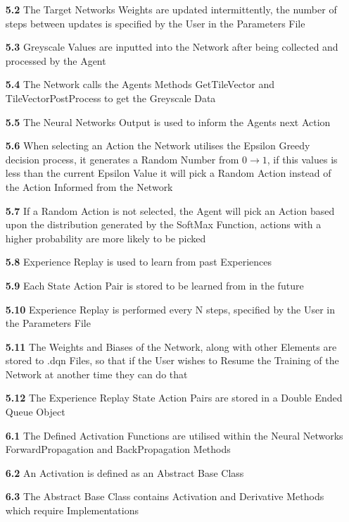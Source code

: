 \begin{flushleft}
\begin{itemize}
            \item[\textbf{5.2}] The Target Networks Weights are updated intermittently, the number of steps between updates is specified by the User in the Parameters File
            \item[\textbf{5.3}] Greyscale Values are inputted into the Network after being collected and processed by the Agent
            \item[\textbf{5.4}] The Network calls the Agents Methods \textsf{GetTileVector} and \textsf{TileVectorPostProcess} to get the Greyscale Data
            \item[\textbf{5.5}] The Neural Networks Output is used to inform the Agents next Action
            \item[\textbf{5.6}] When selecting an Action the Network utilises the Epsilon Greedy decision process, it generates a Random Number from $0\to 1$, if this values is less than the current Epsilon Value it will pick a Random Action instead of the Action Informed from the Network
            \item[\textbf{5.7}] If a Random Action is not selected, the Agent will pick an Action based upon the distribution generated by the SoftMax Function, actions with a higher probability are more likely to be picked
            \item[\textbf{5.8}] Experience Replay is used to learn from past Experiences
            \item[\textbf{5.9}] Each State Action Pair is stored to be learned from in the future
            \item[\textbf{5.10}] Experience Replay is performed every N steps, specified by the User in the Parameters File
            \item[\textbf{5.11}] The Weights and Biases of the Network, along with other Elements are stored to .dqn Files, so that if the User wishes to Resume the Training of the Network at another time they can do that
            \item[\textbf{5.12}] The Experience Replay State Action Pairs are stored in a Double Ended Queue Object
            \item[\textbf{6.1}] The Defined Activation Functions are utilised within the Neural Networks \textsf{ForwardPropagation} and \textsf{BackPropagation} Methods
            \item[\textbf{6.2}] An \textsf{Activation} is defined as an Abstract Base Class 
            \item[\textbf{6.3}] The Abstract Base Class contains \textsf{Activation} and \textsf{Derivative} Methods which require Implementations

\end{itemize}
\end{flushleft}
